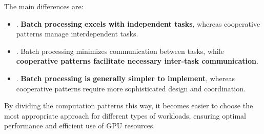 The main differences are:
\begin{itemize}
  \item {}. \textbf{Batch processing excels with independent tasks}, whereas cooperative patterns manage interdependent tasks.
  \item {}. Batch processing minimizes communication between tasks, while \textbf{cooperative patterns facilitate necessary inter-task communication}.
  \item {}. \textbf{Batch processing is generally simpler to implement}, whereas cooperative patterns require more sophisticated design and coordination.
\end{itemize}
By dividing the computation patterns this way, it becomes easier to choose the most appropriate approach for different types of workloads, ensuring optimal performance and efficient use of GPU resources.
